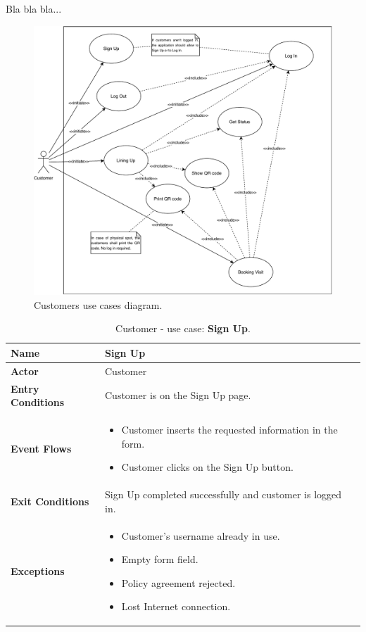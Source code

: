 Bla bla bla...

\begin{figure}[h]
	\centering

	\includegraphics[width=1.0\textwidth]{images/customers_use_cases_diagram.pdf}
	\caption{Customers use cases diagram.}
	\label{customersUseCasesDiagram}
\end{figure}

\begin{table}[h!]
\centering
\begin{tabular}{| m{} | m{} |} 
	\hline
	\textbf{Name} & Sign Up \\ 
	\hline
	\textbf{Actor} & Customer \\ 
	\hline
	\textbf{Entry Conditions} & Customer is on the Sign Up page. \\ 
	\hline
	\textbf{Event Flows} &
	\begin{itemize}
		\item Customer inserts the requested information in the form.
		\item Customer clicks on the Sign Up button.
	\end{itemize} \\ 
	\hline
	\textbf{Exit Conditions} & Sign Up completed successfully and customer is logged in. \\ 
	\hline
	\textbf{Exceptions} &
	\begin{itemize}
		\item Customer's username already in use.
		\item Empty form field.
		\item Policy agreement rejected.
		\item Lost Internet connection.
	\end{itemize} \\ 
	\hline
\end{tabular}
\caption{Customer - use case: \textbf{Sign Up}.}
\label{tableSignUp}
\end{table}

